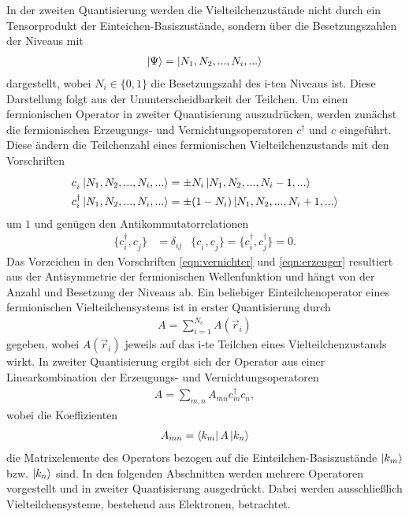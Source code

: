 In der zweiten Quantisierung werden die Vielteilchenzustände nicht durch ein Tensorprodukt der Einteichen-Basiszustände, sondern über die Besetzungszahlen der Niveaus mit
\begin{align}
  \ket{\Psi} = \ket{N_1,N_2,...,N_i,...}
\end{align}
dargestellt, wobei $N_i \in \{ 0,1 \}$ die Besetzungszahl des i-ten Niveaus ist. Diese Darstellung folgt aus der Ununterscheidbarkeit der Teilchen.
Um einen fermionischen Operator in zweiter Quantisierung auszudrücken, werden zunächst die fermionischen Erzeugungs- und Vernichtungsoperatoren $c^\dag$ und $c$ eingeführt.
Diese ändern die Teilchenzahl eines fermionischen Vielteilchenzustands mit den Vorschriften
\begin{align}
  c_i^{\phantom{\dag}} \ket{N_1,N_2,...,N_i,...} & = \pm N_i \ket{N_1,N_2,...,N_i-1,...} \label{eqn:vernichter}\\
  c_i^\dag \ket{N_1,N_2,..., N_i,...} & = \pm (1-N_i) \ket{N_1,N_2,...,N_i+1,...} \label{eqn:erzeuger}
\end{align}
um $1$ und genügen den Antikommutatorrelationen
\begin{align}
  \{ c_i^\dag, c_j^{\phantom{\dag}} \} & = \delta_{ij} & \{ c_i^{\phantom{\dag}}, c_j^{\phantom{\dag}} \} = \{ c_i^\dag, c_j^\dag \} = 0.
  \label{eqn:ckommutatoren}
\end{align}
Das Vorzeichen in den Vorschriften \eqref{eqn:vernichter} und \eqref{eqn:erzeuger} resultiert aus der Antisymmetrie der fermionischen Wellenfunktion und hängt von der Anzahl und Besetzung der Niveaus ab.
Ein beliebiger Einteilchenoperator eines fermionischen Vielteilchensystems ist in erster Quantisierung durch
\begin{align}
  A = \sum_{i=1}^{N_e} A(\vec{r}_i)
\end{align}
gegeben, wobei $A(\vec{r}_i)$ jeweils auf das i-te Teilchen eines Vielteilchenzustands wirkt.
In zweiter Quantisierung ergibt sich der Operator aus einer Linearkombination der Erzeugungs- und Vernichtungsoperatoren
\begin{align}
  A = \sum_{m,n} A_{mn} c_m^\dag c_n^{\phantom{\dag}},
\end{align}
wobei die Koeffizienten
\begin{align}
  A_{mn} = \bra{k_m} A \ket{k_n}
  \label{eqn:matrixelemente}
\end{align}
die Matrixelemente des Operators bezogen auf die Einteilchen-Basiszustände $\ket{k_m}$ bzw. $\ket{k_n}$ sind.
In den folgenden Abschnitten werden mehrere Operatoren vorgestellt und in zweiter Quantisierung ausgedrückt.
Dabei werden ausschließlich Vielteilchensysteme, bestehend aus Elektronen, betrachtet. \cite{czycholl}

